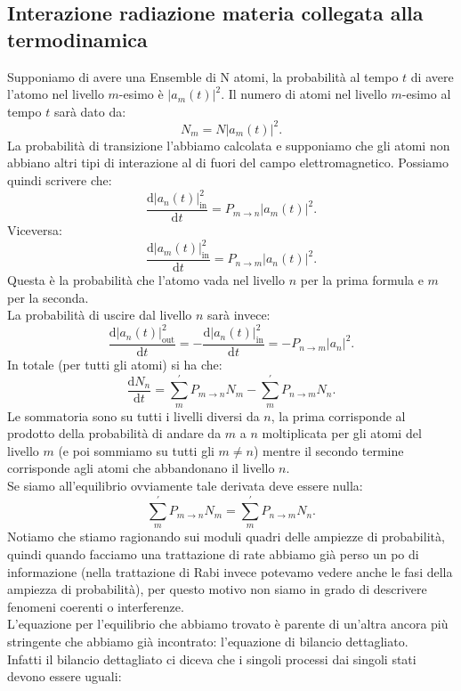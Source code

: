 \subsection{Interazione radiazione materia collegata alla termodinamica}%
\label{sub:Interazione radiazione materia collegata alla termodinamica}
Supponiamo di avere una Ensemble di N atomi, la probabilità al tempo $t$  di avere l'atomo nel livello $m$-esimo è $\left|a_m(t) \right|^2$. Il numero di atomi nel livello $m$-esimo al tempo $t$  sarà dato da:
\[
    N_m = N\left|a_m(t) \right|^2
.\] 
La probabilità di transizione l'abbiamo calcolata e supponiamo che gli atomi non abbiano altri tipi di interazione al di fuori del campo elettromagnetico. Possiamo quindi scrivere che:
\[
    \frac{\text{d} \left|a_n(t) \right|^2_\text{in} }{\text{d} t} =
    P_{m\to n}\left|a_m(t) \right|^2
.\] 
Viceversa:
\[
    \frac{\text{d} \left|a_m(t) \right|^2_\text{in} }{\text{d} t} =
    P_{n\to m}\left|a_n(t) \right|^2
.\] 
Questa è la probabilità che l'atomo vada nel livello $n$  per la prima formula e $m$  per la seconda.\\
La probabilità di uscire dal livello $n$  sarà invece:
\[
    \frac{\text{d} \left|a_n(t)\right|^2_\text{out} }{\text{d} t} =
    -\frac{\text{d} \left|a_n(t) \right|^2_\text{in} }{\text{d} t}=
    -P_{n\to m}\left|a_n\right|^2
.\] 
In totale (per tutti gli atomi) si ha che:
\[
\frac{\text{d} N_n}{\text{d} t} = \sum_{m}^{'} P_{m\to n}N_m 
-\sum_{m}^{'} P_{n\to m}N_n
.\] 
Le sommatoria sono su tutti i livelli diversi da $n$, la prima corrisponde al prodotto della probabilità di andare da $m$  a $n$  moltiplicata per gli atomi del livello $m$  (e poi sommiamo su tutti gli $m\neq n$) mentre il secondo termine corrisponde agli atomi che abbandonano il livello $n$.\\
Se siamo all'equilibrio ovviamente tale derivata deve essere nulla:
\[
\sum_{m}^{'} P_{m\to n}N_m =
\sum_{m}^{'} P_{n\to m}N_{n}
.\] 
Notiamo che stiamo ragionando sui moduli quadri delle ampiezze di probabilità, quindi quando facciamo una trattazione di rate abbiamo già perso un po di informazione (nella trattazione di Rabi invece potevamo vedere anche le fasi della ampiezza di probabilità), per questo motivo non siamo in grado di descrivere fenomeni coerenti o interferenze.\\
L'equazione per l'equilibrio che abbiamo trovato è parente di un'altra ancora più stringente che abbiamo già incontrato: l'equazione di bilancio dettagliato.\\
Infatti il bilancio dettagliato ci diceva che i singoli processi dai singoli stati devono essere uguali:
